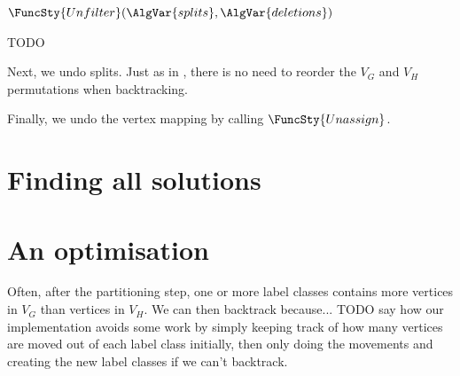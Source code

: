 \begin{algorithm}[h!]
\DontPrintSemicolon
\nl $\FuncSty{Unfilter}(\AlgVar{splits}, \AlgVar{deletions})$ \;
\nl {}
\caption{TODO}
\label{McSplitSIAlgUnfilter}
\end{algorithm}

Next, we undo splits.  Just as in \McSplit, there is
no need to reorder the $V_G$ and $V_H$ permutations when backtracking.

Finally, we undo the vertex mapping by calling $\FuncSty{Unassign}$.

\section{Finding all solutions}

\section{An optimisation}

Often, after the partitioning step, one or more label classes contains more
vertices in $V_G$ than vertices in $V_H$.  We can then backtrack because...
TODO say how our implementation avoids some work by simply keeping track of
how many vertices are moved out of each label class initially, then only
doing the movements and creating the new label classes if we can't backtrack.

